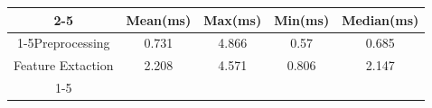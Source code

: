\documentclass{standalone}
\begin{document}
 
 \begin{tabular}{|c |c |c |c |c |}
\cline{2-5}\cline{2-5} \multicolumn{1}{c |}{ } & Mean(ms) & Max(ms) & Min(ms) & Median(ms)\\ 
\cline{1-5}Preprocessing & 0.731 & 4.866 & 0.57 & 0.685\\ 
 \hhline{|=|=|=|=|=|}Feature Extaction & 2.208 & 4.571 & 0.806 & 2.147\\ 
 \cline{1-5}\hline \end{tabular}
 
\end{document}

